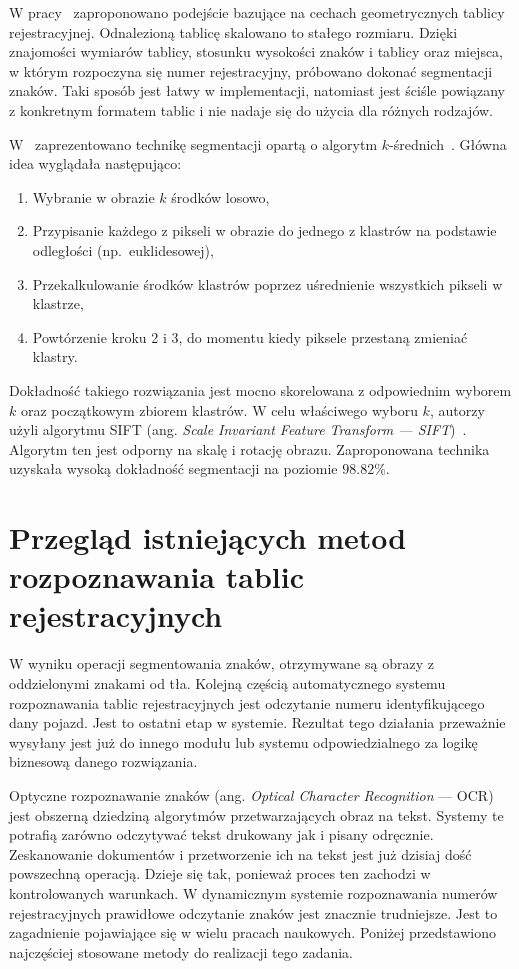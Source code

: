 W pracy~\cite{1381137} zaproponowano podejście bazujące na cechach geometrycznych tablicy rejestracyjnej.
Odnalezioną tablicę skalowano to stałego rozmiaru.
Dzięki znajomości wymiarów tablicy, stosunku wysokości znaków i tablicy oraz miejsca, w którym rozpoczyna się numer rejestracyjny, próbowano dokonać segmentacji znaków.
Taki sposób jest łatwy w implementacji, natomiast jest ściśle powiązany z konkretnym formatem tablic i nie nadaje się do użycia dla różnych rodzajów.

W~\cite{segmentation_kmeans} zaprezentowano technikę segmentacji opartą o algorytm $k$-średnich~\cite{1017616}.
Główna idea wyglądała następująco:
\begin{enumerate}
    \item Wybranie w obrazie $k$ środków losowo,
    \item Przypisanie każdego z pikseli w obrazie do jednego z klastrów na podstawie odległości (np.\ euklidesowej),
    \item Przekalkulowanie środków klastrów poprzez uśrednienie wszystkich pikseli w klastrze,
    \item Powtórzenie kroku 2 i 3, do momentu kiedy piksele przestaną zmieniać klastry.
\end{enumerate}
Dokładność takiego rozwiązania jest mocno skorelowana z odpowiednim wyborem $k$ oraz początkowym zbiorem klastrów.
W celu właściwego wyboru $k$, autorzy użyli algorytmu SIFT (ang. \textit{Scale Invariant Feature Transform --- SIFT})~\cite{sift}.
Algorytm ten jest odporny na skalę i rotację obrazu.
Zaproponowana technika uzyskała wysoką dokładność segmentacji na poziomie $98.82\%$.


\section{Przegląd istniejących metod rozpoznawania tablic rejestracyjnych}
W wyniku operacji segmentowania znaków, otrzymywane są obrazy z oddzielonymi znakami od tła.
Kolejną częścią automatycznego systemu rozpoznawania tablic rejestracyjnych jest odczytanie numeru identyfikującego dany pojazd.
Jest to ostatni etap \linebreak w systemie.
Rezultat tego działania przeważnie wysyłany jest już do innego modułu lub systemu odpowiedzialnego za logikę biznesową danego rozwiązania.

Optyczne rozpoznawanie znaków (ang. \textit{Optical Character Recognition} --- OCR) jest obszerną dziedziną algorytmów przetwarzających obraz na tekst.
Systemy te potrafią zarówno odczytywać tekst drukowany jak i pisany odręcznie.
Zeskanowanie dokumentów i przetworzenie ich na tekst jest już dzisiaj dość powszechną operacją.
Dzieje się tak, ponieważ proces ten zachodzi w kontrolowanych warunkach.
W dynamicznym systemie rozpoznawania numerów rejestracyjnych prawidłowe odczytanie znaków jest znacznie trudniejsze.
Jest to zagadnienie pojawiające się w wielu pracach naukowych.
Poniżej przedstawiono najczęściej stosowane metody do realizacji tego zadania.

